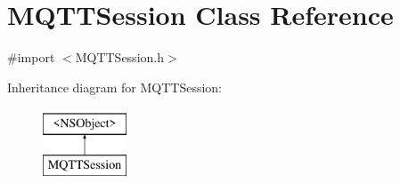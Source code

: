 \hypertarget{interface_m_q_t_t_session}{}\section{M\+Q\+T\+T\+Session Class Reference}
\label{interface_m_q_t_t_session}


{\ttfamily \#import $<$M\+Q\+T\+T\+Session.\+h$>$}

Inheritance diagram for M\+Q\+T\+T\+Session\+:\begin{figure}[H]
\begin{center}
\leavevmode
\includegraphics[height=2.000000cm]{interface_m_q_t_t_session}
\end{center}
\end{figure}
